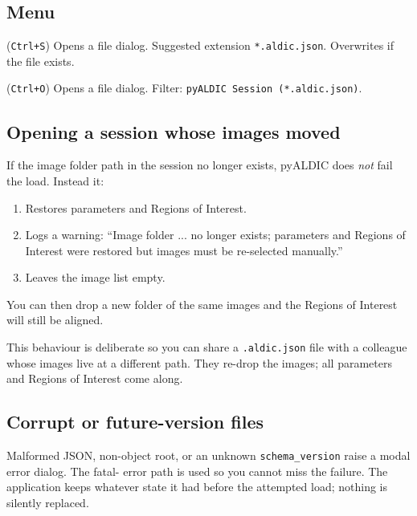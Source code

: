 \subsection{Menu}

\begin{description}[leftmargin=1.2cm,style=nextline]
  \item[File $\to$ Save Session\ldots] (\texttt{Ctrl+S})
    Opens a file dialog. Suggested extension
    \texttt{*.aldic.json}. Overwrites if the file exists.
  \item[File $\to$ Open Session\ldots] (\texttt{Ctrl+O})
    Opens a file dialog. Filter: \texttt{pyALDIC Session
    (*.aldic.json)}.
\end{description}

\subsection{Opening a session whose images moved}

If the image folder path in the session no longer exists, pyALDIC
does \emph{not} fail the load. Instead it:
\begin{enumerate}
  \item Restores parameters and Regions of Interest.
  \item Logs a warning: ``Image folder ... no longer exists;
        parameters and Regions of Interest were restored but images
        must be re-selected manually.''
  \item Leaves the image list empty.
\end{enumerate}

You can then drop a new folder of the same images and the Regions
of Interest will still be aligned.

\begin{tipbox}
This behaviour is deliberate so you can share a \texttt{.aldic.json}
file with a colleague whose images live at a different path.
They re-drop the images; all parameters and Regions of Interest
come along.
\end{tipbox}

\subsection{Corrupt or future-version files}

Malformed JSON, non-object root, or an unknown
\texttt{schema\_version} raise a modal error dialog. The fatal-
error path is used so you cannot miss the failure. The application
keeps whatever state it had before the attempted load; nothing is
silently replaced.
